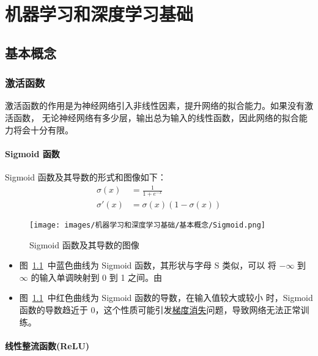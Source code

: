 \part{机器学习和深度学习基础}

\chapter{基本概念}

\section{激活函数}

激活函数的作用是为神经网络引入非线性因素，提升网络的拟合能力。如果没有激活函数，
无论神经网络有多少层，输出总为输入的线性函数，因此网络的拟合能力将会十分有限。

\subsection{Sigmoid 函数}
\label{subsec:Sigmoid}

Sigmoid 函数及其导数的形式和图像如下：
\begin{align}
  \label{equ:sigmoid}
  \sigma(x) & = \frac{1}{1 + e^{-x}} \\
  \label{equ:sigmoid-d}
  \sigma'(x) & = \sigma(x) (1-\sigma(x))
\end{align}

\begin{figure}[ht]
  \centering
  \texttt{[image: images/机器学习和深度学习基础/基本概念/Sigmoid.png]}
  \caption{Sigmoid 函数及其导数的图像}
  \label{fig:sigmoid}
\end{figure}

\begin{itemize}
\item 图~\ref{fig:sigmoid}~中蓝色曲线为 Sigmoid 函数，其形状与字母 S 类似，可以
  将 $-\infty$ 到 $\infty$ 的输入单调映射到 0 到 1 之间。由
\item 图~\ref{fig:sigmoid}~中红色曲线为 Sigmoid 函数的导数，在输入值较大或较小
  时，Sigmoid 函数的导数趋近于 0，这个性质可能引发\hyperref[subsec:gradient-vanish-explosion]{梯度消失}问题，导致网络无法正常训练。
\end{itemize}


\subsection{线性整流函数(ReLU)}

